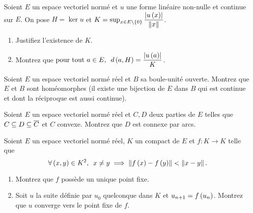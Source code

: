 \begin{corr}
\end{corr}

\begin{exosss}[Exercice 33]
Soient \(E\) un espace vectoriel normé et \(u\) une forme linéaire non-nulle et continue sur \(E\). On pose \(H=\ker u\) et \(K=\sup_{x\in E\setminus\left\lbrace0\right\rbrace}\dfrac{\left\lvert u\left(x\right)\right\rvert}{\left\|x\right\|}\).

\begin{enumerate}
    \item Justifiez l'existence de \(K\). \\
    \item Montrez que \(\quantifs{\text{pour tout }a\in E}d\paren{a,H}=\dfrac{\abs{u\paren{a}}}{K}\).
\end{enumerate}
\end{exosss}

\begin{corr}
\end{corr}

\begin{exo}
Soient \(E\) un espace vectoriel normé réel et \(B\) sa boule-unité ouverte. Montrez que \(E\) et \(B\) sont homéomorphes (\ie il existe une bijection de \(E\) dans \(B\) qui est continue et dont la réciproque est aussi continue).
\end{exo}

\begin{corr}
\end{corr}

\begin{exo}
Soient \(E\) un espace vectoriel normé réel et \(C,D\) deux parties de \(E\) telles que \(C\subseteq D\subseteq\overline{C}\) et \(C\) convexe. Montrez que \(D\) est connexe par arcs.
\end{exo}

\begin{corr}
\end{corr}

\begin{exo}
Soient \(E\) un espace vectoriel normé réel, \(K\) un compact de \(E\) et \(f:K\to K\) telle que \[\quantifs{\forall\paren{x,y}\in K^2}x\not=y\imp\norme{f\paren{x}-f\paren{y}}<\norme{x-y}.\]

\begin{enumerate}
    \item Montrez que \(f\) possède un unique point fixe. \\
    \item Soit \(u\) la suite définie par \(u_0\) quelconque dans \(K\) et \(u_{n+1}=f\left(u_n\right)\). Montrez que \(u\) converge vers le point fixe de \(f\).
\end{enumerate}
\end{exo}

